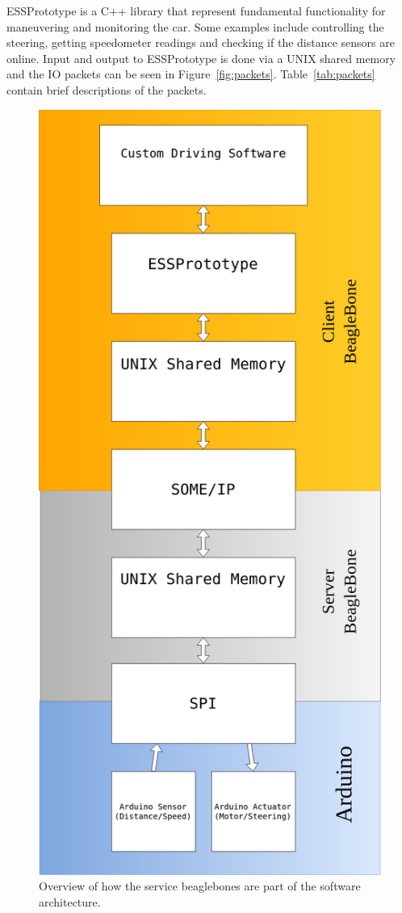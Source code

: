 \documentclass[11pt, titlepage]{article} %
\begin{document}
ESSPrototype is a C++ library that represent fundamental functionality for maneuvering and monitoring
the car. Some examples include controlling the steering, getting speedometer readings and checking if the distance sensors are online.
Input and output to ESSPrototype is done via a UNIX shared memory and the IO packets can be seen in Figure~\ref{fig:packets}. Table~\ref{tab:packets}
contain brief descriptions of the packets.


\begin{figure}[H]
	\centering
   	\includegraphics[scale=0.25]{arch_bbb.png}
   	\caption{Overview of how the service beaglebones are part of the software architecture.}
    \label{fig:bbb_arch}
\end{figure}
\end{document}
